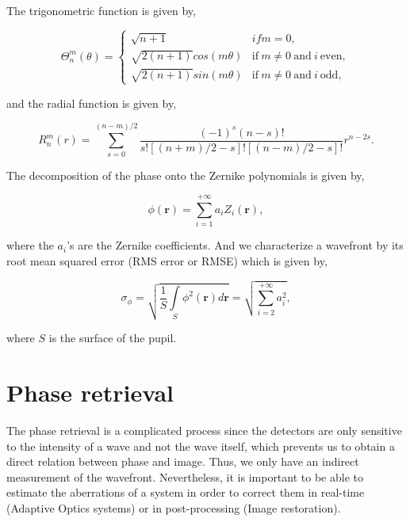 The trigonometric function is given by,

\begin{equation}
\Theta_n^m(\theta) = 
\begin{cases} 
\sqrt{n+1} &if m=0, \\
\sqrt{2(n+1)}cos(m\theta) &\mathrm{if} \ m \neq 0 \ \mathrm{and} \ i \ \mathrm{even}, \\
\sqrt{2(n+1)}sin(m\theta) &\mathrm{if} \ m \neq 0 \ \mathrm{and} \ i \ \mathrm{odd},
\end{cases}
\label{eqt:trigoFunc}
\end{equation}

and the radial function is given by,

\begin{equation}
R_n^m(r) = \sum\limits_{s=0}^{(n-m)/2}\frac{(-1)^s(n-s)!}{s![(n+m)/2-s]![(n-m)/2-s]!}r^{n-2s}.
\label{eqt:radialFunction}
\end{equation}

The decomposition of the phase onto the Zernike polynomials is given by,

\begin{equation}
\phi (\mathbf{r}) = \sum\limits_{i=1}^{+\infty}a_iZ_i(\mathbf{r}),
\label{eqt:decompPhase}
\end{equation}

where the $a_i$'s are the Zernike coefficients. And we characterize a wavefront by its root mean squared error (RMS error or RMSE) which is given by,

\begin{equation}
\sigma_{\phi} = \sqrt{\frac{1}{S}\int\limits_S \phi^2(\mathbf{r})d\mathbf{r}} = \sqrt{\sum\limits_{i=2}^{+\infty}a_i^2},
\label{eqt:WFrmsError}
\end{equation}

where $S$ is the surface of the pupil.

\section{Phase retrieval}

The phase retrieval is a complicated process since the detectors are only sensitive to the intensity of a wave and not the wave itself, which prevents us to obtain a direct relation between phase and image. Thus, we only have an indirect measurement of the wavefront. Nevertheless, it is important to be able to estimate the aberrations of a system in order to correct them in real-time (Adaptive Optics systems) or in post-processing (Image restoration).

